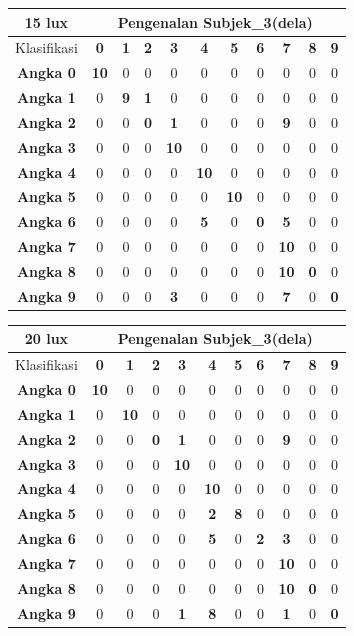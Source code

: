 \begin{tabular}{|c|c|c|c|c|c|c|c|c|c|c|}
	\hline 15 lux
	& \multicolumn{10}{|c|}{Pengenalan Subjek\_3(dela)} \\
	\hline  Klasifikasi&\textbf{0} &\textbf{1} &\textbf{2} &\textbf{3} &\textbf{4}&\textbf{5} &\textbf{6}&\textbf{7}&\textbf{8}&\textbf{9}\\
	\hline \textbf{Angka 0} &\textbf{10} &0 &0 &0&0&0&0&0&0&0\\
	\hline \textbf{Angka 1} &0 &\textbf{9} &\textbf{1} &0&0&0&0&0&0&0\\
	\hline \textbf{Angka 2} &0 &0 &\textbf{0} &\textbf{1} &0&0 &0&\textbf{9}&0&0\\
	\hline \textbf{Angka 3} &0 &0 &0 &\textbf{10} &0&0 &0&0&0&0\\
	\hline \textbf{Angka 4} &0 &0 &0 &0 &\textbf{10}&0&0&0&0&0\\
	\hline \textbf{Angka 5} &0 &0 &0 &0 &0 &\textbf{10}&0&0&0&0\\
	\hline \textbf{Angka 6} &0 &0 &0 &0 &\textbf{5} &0&\textbf{0}&\textbf{5}&0&0\\
	\hline \textbf{Angka 7} &0 &0 &0 &0 &0 &0&0&\textbf{10}&0&0\\
	\hline \textbf{Angka 8} &0 &0 &0 &0&0&0&0&\textbf{10}&\textbf{0}&0 \\
	\hline \textbf{Angka 9} &0 &0 &0 &\textbf{3}&0&0&0&\textbf{7}&0&\textbf{0} \\
	\hline
\end{tabular}

\begin{tabular}{|c|c|c|c|c|c|c|c|c|c|c|}
	\hline 20 lux
	& \multicolumn{10}{|c|}{Pengenalan Subjek\_3(dela)} \\
	\hline  Klasifikasi&\textbf{0} &\textbf{1} &\textbf{2} &\textbf{3} &\textbf{4}&\textbf{5} &\textbf{6}&\textbf{7}&\textbf{8}&\textbf{9}\\
	\hline \textbf{Angka 0} &\textbf{10} &0 &0 &0&0&0&0&0&0&0\\
	\hline \textbf{Angka 1} &0 &\textbf{10} &0 &0&0&0&0&0&0&0\\
	\hline \textbf{Angka 2} &0 &0 &\textbf{0} &\textbf{1} &0&0 &0&\textbf{9}&0&0\\
	\hline \textbf{Angka 3} &0 &0 &0 &\textbf{10} &0&0 &0&0&0&0\\
	\hline \textbf{Angka 4} &0 &0 &0 &0 &\textbf{10}&0&0&0&0&0\\
	\hline \textbf{Angka 5} &0 &0 &0 &0 &\textbf{2} &\textbf{8}&0&0&0&0\\
	\hline \textbf{Angka 6} &0 &0 &0 &0 &\textbf{5} &0&\textbf{2}&\textbf{3}&0&0\\
	\hline \textbf{Angka 7} &0 &0 &0 &0 &0 &0&0&\textbf{10}&0&0\\
	\hline \textbf{Angka 8} &0 &0 &0 &0&0&0&0&\textbf{10}&\textbf{0}&0 \\
	\hline \textbf{Angka 9} &0 &0 &0 &\textbf{1}&\textbf{8}&0&0&\textbf{1}&0&\textbf{0} \\
	\hline
\end{tabular}


